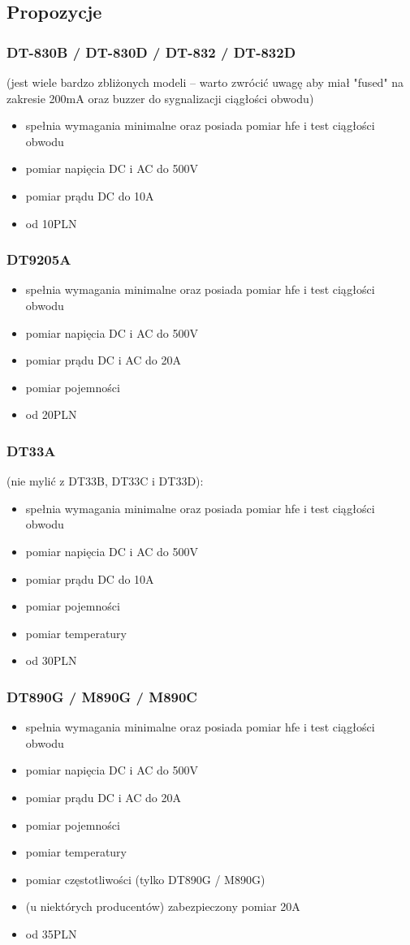 \documentclass{pdfBooklets}
\newcommand\zaleta{\item[\textbf{\ttfamily +}]}
\newcommand\info{\item[\textbf{\ttfamily *}]}
\begin{document}
	\subsection{Propozycje}
	
	\subsubsection{DT-830B /  DT-830D / DT-832 / DT-832D} (jest wiele bardzo zbliżonych modeli – warto zwrócić uwagę aby miał "fused" na zakresie 200mA oraz buzzer do sygnalizacji ciągłości obwodu)
		\begin{itemize}
			\zaleta spełnia wymagania minimalne oraz posiada pomiar hfe i test ciągłości obwodu
			\zaleta pomiar napięcia DC i AC do 500V
			\zaleta pomiar prądu DC do 10A
			\info od 10PLN
		\end{itemize}

	\subsubsection{DT9205A}
		\begin{itemize}
			\zaleta spełnia wymagania minimalne oraz posiada pomiar hfe i test ciągłości obwodu
			\zaleta pomiar napięcia DC i AC do 500V
			\zaleta pomiar prądu DC i AC do 20A
			\zaleta pomiar pojemności
			\info od 20PLN
		\end{itemize}
	
	\subsubsection{DT33A} (nie mylić z DT33B, DT33C i DT33D):
		\begin{itemize}
			\zaleta spełnia wymagania minimalne oraz posiada pomiar hfe i test ciągłości obwodu
			\zaleta pomiar napięcia DC i AC do 500V
			\zaleta pomiar prądu DC do 10A
			\zaleta pomiar pojemności
			\zaleta pomiar temperatury
			\info od 30PLN
		\end{itemize}
	
	\subsubsection{DT890G / M890G / M890C}
		\begin{itemize}
			\zaleta spełnia wymagania minimalne oraz posiada pomiar hfe i test ciągłości obwodu
			\zaleta pomiar napięcia DC i AC do 500V
			\zaleta pomiar prądu DC i AC do 20A
			\zaleta pomiar pojemności
			\zaleta pomiar temperatury
			\zaleta pomiar częstotliwości (tylko DT890G / M890G)
			\zaleta (u niektórych producentów) zabezpieczony pomiar 20A
			\info od 35PLN
		\end{itemize}
	
\end{document}
